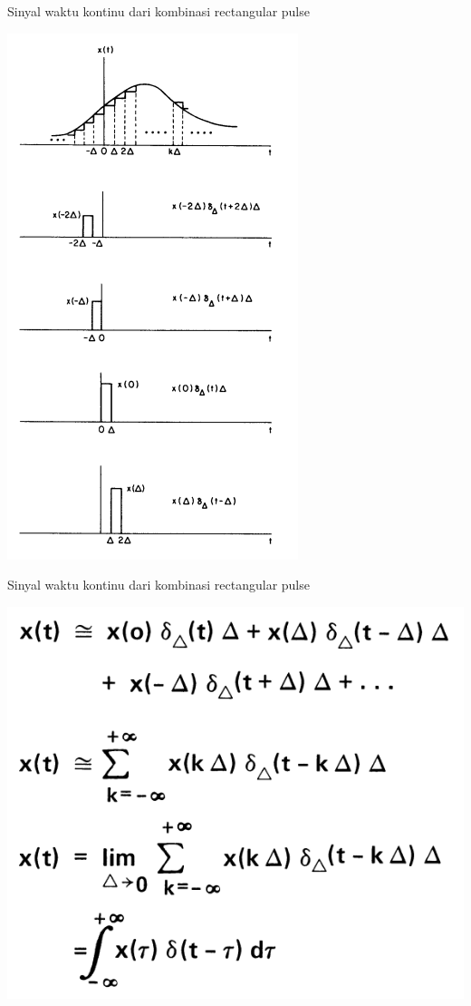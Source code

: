 \documentclass[aspectratio=169]{beamer}
\begin{document}
\begin{frame}{Sinyal waktu kontinu dari kombinasi rectangular pulse}
	\begin{center}
		\includegraphics[height=0.8\textheight]{gambar/03.konvolusi/fig.4.04}
	\end{center}
\end{frame}

\begin{frame}{Sinyal waktu kontinu dari kombinasi rectangular pulse}
	\begin{center}
		\includegraphics[height=0.8\textheight]{gambar/03.konvolusi/fig.4.05}
	\end{center}
\end{frame}
\end{document}
